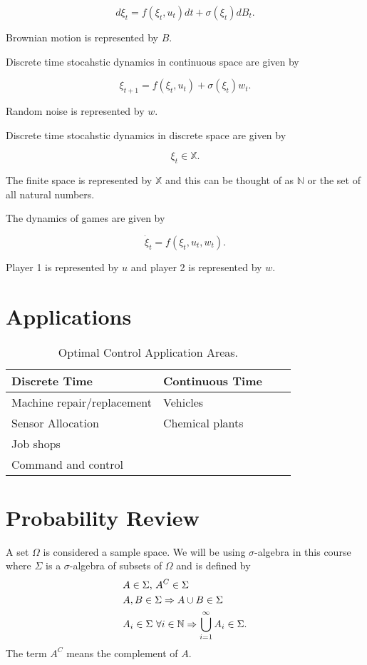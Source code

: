 \begin{equation*}
d\xi_t = f(\xi_t,u_t)dt + \sigma(\xi_t)dB_t.
\end{equation*}

Brownian motion is represented by $B$.

Discrete time stocahstic dynamics in continuous space are given by

\begin{equation*}
\xi_{t+1} = f(\xi_t,u_t) + \sigma(\xi_t)w_t.
\end{equation*}

Random noise is represented by $w$.

Discrete time stocahstic dynamics in discrete space are given by

\begin{equation*}
\xi_t \in \mathbb{X}.
\end{equation*}

The finite space is represented by $\mathbb{X}$ and this can be thought of as $\mathbb{N}$ or the set of all natural numbers.

The dynamics of games are given by

\begin{equation*}
\dot\xi_t = f(\xi_t,u_t,w_t).
\end{equation*}

Player 1 is represented by $u$ and player 2 is represented by $w$.

\section{Applications}
\begin{table}[ht!]
\caption{Optimal Control Application Areas.}
\small
\centering
\begin{tabular}{@{}lllr@{}} \toprule
Discrete Time              & Continuous Time \\ \midrule
Machine repair/replacement & Vehicles        \\
Sensor Allocation          & Chemical plants \\
Job shops                  &                 \\
Command and control        &                 \\ \bottomrule
\end{tabular}%
\label{tab:applications}
\end{table}

\section{Probability Review}
A set $\Omega$ is considered a sample space.
We will be using $\sigma$-algebra in this course where $\Sigma$ is a $\sigma$-algebra of subsets of $\Omega$  and is defined by
\begin{align*}
&A \in \Sigma \textnormal{, } A^C \in \Sigma \\
&A,B \in \Sigma \Rightarrow A \cup B \in \Sigma \\
&A_i \in \Sigma~\forall i \in \mathbb{N} \Rightarrow \bigcup_{i=1}^\infty A_i \in \Sigma.
\end{align*}
The term $A^C$ means the complement of $A$.

